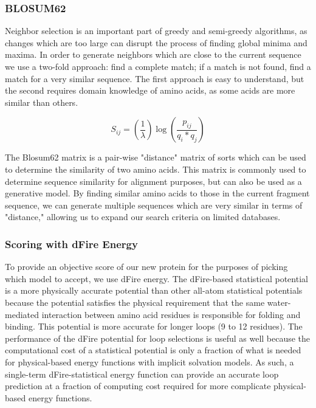 \documentclass{article}
\begin{document}
\subsubsection*{BLOSUM62}

Neighbor selection is an important part of greedy and semi-greedy algorithms, as changes which are too large can disrupt the process of finding global minima and maxima. In order to generate neighbors which are close to the current sequence we use a two-fold approach: find a complete match; if a match is not found, find a match for a very similar sequence. The first approach is easy to understand, but the second requires domain knowledge of amino acids, as some acids are more similar than others.

\begin{equation*}
	S_{ij}= \left( \frac{1}{\lambda} \right)\log{\left( \frac{p_{ij}}{q_i * q_j} \right)}
\end{equation*}

The Blosum62 matrix is a pair-wise "distance" matrix of sorts which can be used to determine the similarity of two amino acids. This matrix is commonly used to determine sequence similarity for alignment purposes, but can also be used as a generative model. By finding similar amino acids to those in the current fragment sequence, we can generate multiple sequences which are very similar in terms of "distance," allowing us to expand our search criteria on limited databases.


\subsubsection*{Scoring with dFire Energy}

To provide an objective score of our new protein for the purposes of picking which model to accept, we use dFire energy.  The dFire-based statistical potential is a more physically accurate potential than other all-atom statistical potentials because the potential satisfies the physical requirement that the same water-mediated interaction between amino acid residues is responsible for folding and binding. This potential is more accurate for longer loops (9 to 12 residues). The performance of the dFire potential for loop selections is useful as well because the computational cost of a statistical potential is only a fraction of what is needed for physical-based energy functions with implicit solvation models. As such, a single-term dFire-statistical energy function can provide an accurate loop prediction at a fraction of computing cost required for more complicate physical-based energy functions.
\end{document}
